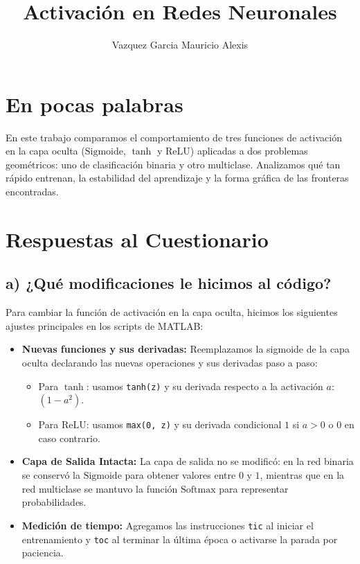 \documentclass[12pt]{article}
\title{\textbf{Activación en Redes Neuronales}}
\author{Vazquez Garcia Mauricio Alexis}
\begin{document}
\maketitle

\section*{En pocas palabras}
En este trabajo comparamos el comportamiento de tres funciones de activación en la capa oculta ($\text{Sigmoide}$, $\tanh$ y $\text{ReLU}$) aplicadas a dos problemas geométricos:
uno de clasificación binaria  y otro multiclase. Analizamos qué tan rápido entrenan, la estabilidad del aprendizaje y la forma gráfica de las fronteras encontradas.

\section{Respuestas al Cuestionario}

\subsection{a) ¿Qué modificaciones le hicimos al código?}
Para cambiar la función de activación en la capa oculta, hicimos los siguientes ajustes principales en los scripts de MATLAB:

\begin{itemize}
    \item \textbf{Nuevas funciones y sus derivadas:} Reemplazamos la sigmoide de la capa oculta declarando las nuevas operaciones y sus derivadas paso a paso:
    \begin{itemize}
        \item Para $\tanh$: usamos \texttt{tanh(z)} y su derivada respecto a la activación $a$: $(1 - a^2)$.
        \item Para $\text{ReLU}$: usamos \texttt{max(0, z)} y su derivada condicional $1$ si $a > 0$ o $0$ en caso contrario.
    \end{itemize}
    \item \textbf{Capa de Salida Intacta:} La capa de salida no se modificó: en la red binaria se conservó la $\text{Sigmoide}$ para obtener valores entre $0$ y $1$, mientras que en la red multiclase 
    se mantuvo la función $\text{Softmax}$ para representar probabilidades.
    \item \textbf{Medición de tiempo:} Agregamos las instrucciones \texttt{tic} al iniciar el entrenamiento y \texttt{toc} al terminar la última época o activarse la parada por paciencia.
\end{itemize}
\newpage 
\end{document}
